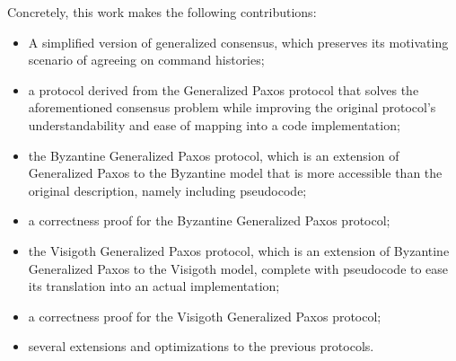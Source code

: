 \par
Concretely, this work makes the following contributions:
\begin{itemize}
	\item A simplified version of generalized consensus, which preserves its motivating scenario of agreeing on command histories;
	\item a protocol derived from the Generalized Paxos protocol that solves the aforementioned consensus problem while improving the original protocol's understandability and ease of mapping into a code implementation;
	\item the Byzantine Generalized Paxos protocol, which is an extension of Generalized Paxos to the Byzantine model that is more accessible than the original description, namely including pseudocode;
	\item a correctness proof for the Byzantine Generalized Paxos protocol;
	\item the Visigoth Generalized Paxos protocol, which is an extension of Byzantine Generalized Paxos to the Visigoth model, complete with pseudocode to ease its translation into an actual implementation;
	\item a correctness proof for the Visigoth Generalized Paxos protocol;
	\item several extensions and optimizations to the previous protocols.
\end{itemize}

